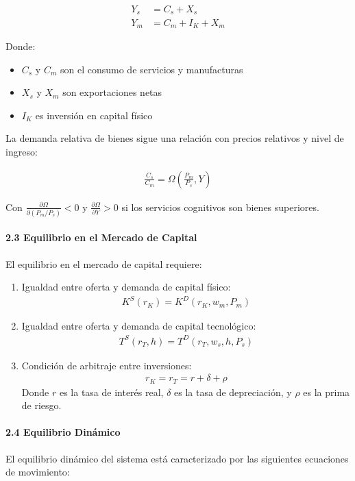 \documentclass{article}
\theoremstyle{remark}
\theoremstyle{definition}
\begin{document}
\begin{tcolorbox}
\begin{align}
Y_s &= C_s + X_s\\
Y_m &= C_m + I_K + X_m
\end{align}

Donde:
\begin{itemize}
\item $C_s$ y $C_m$ son el consumo de servicios y manufacturas
\item $X_s$ y $X_m$ son exportaciones netas
\item $I_K$ es inversión en capital físico
\end{itemize}

La demanda relativa de bienes sigue una relación con precios relativos y nivel de ingreso:

\begin{align}
\frac{C_s}{C_m} = \Omega\left(\frac{P_m}{P_s}, Y\right)
\end{align}

Con $\frac{\partial \Omega}{\partial (P_m/P_s)} < 0$ y $\frac{\partial \Omega}{\partial Y} > 0$ si los servicios cognitivos son bienes superiores.

\paragraph{2.3 Equilibrio en el Mercado de Capital}
El equilibrio en el mercado de capital requiere:

\begin{enumerate}
\item Igualdad entre oferta y demanda de capital físico:
\begin{align}
K^S(r_K) = K^D(r_K, w_m, P_m)
\end{align}

\item Igualdad entre oferta y demanda de capital tecnológico:
\begin{align}
T^S(r_T, h) = T^D(r_T, w_s, h, P_s)
\end{align}

\item Condición de arbitraje entre inversiones:
\begin{align}
r_K = r_T = r + \delta + \rho
\end{align}
Donde $r$ es la tasa de interés real, $\delta$ es la tasa de depreciación, y $\rho$ es la prima de riesgo.
\end{enumerate}

\paragraph{2.4 Equilibrio Dinámico}
El equilibrio dinámico del sistema está caracterizado por las siguientes ecuaciones de movimiento:


\end{tcolorbox}
\end{document}
